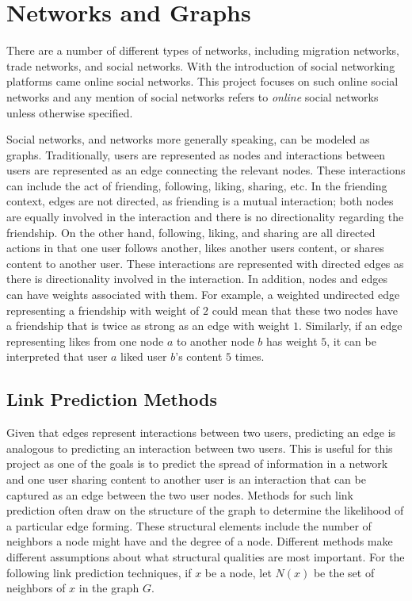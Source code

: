 \section{Networks and Graphs} \label{ch:networksgraphs}
There are a number of different types of networks, including migration networks, trade networks, and social networks.  With the introduction of social networking platforms came online social networks.  This project focuses on such online social networks and any mention of social networks refers to \textit{online} social networks unless otherwise specified.

Social networks, and networks more generally speaking, can be modeled as graphs.  Traditionally, users are represented as nodes and interactions between users are represented as an edge connecting the relevant nodes.  These interactions can include the act of friending, following, liking, sharing, etc.  In the friending context, edges are not directed, as friending is a mutual interaction; both nodes are equally involved in the interaction and there is no directionality regarding the friendship.  On the other hand, following, liking, and sharing are all directed actions in that one user follows another, likes another users content, or shares content to another user.  These interactions are represented with directed edges as there is directionality involved in the interaction.  In addition, nodes and edges can have weights associated with them.  For example, a weighted undirected edge representing a friendship with weight of $2$ could mean that these two nodes have a friendship that is twice as strong as an edge with weight $1$.  Similarly, if an edge representing likes from one node $a$ to another node $b$ has weight $5$, it can be interpreted that user $a$ liked user $b$'s content $5$ times.

\subsection{Link Prediction Methods} \label{sec:linkpred}
Given that edges represent interactions between two users, predicting an edge is analogous to predicting an interaction between two users.  This is useful for this project as one of the goals is to predict the spread of information in a network and one user sharing content to another user is an interaction that can be captured as an edge between the two user nodes.  Methods for such link prediction often draw on the structure of the graph to determine the likelihood of a particular edge forming.  These structural elements include the number of neighbors a node might have and the degree of a node.  Different methods make different assumptions about what structural qualities are most important.  For the following link prediction techniques, if $x$ be a node, let $N(x)$ be the set of neighbors of $x$ in the graph $G$.
